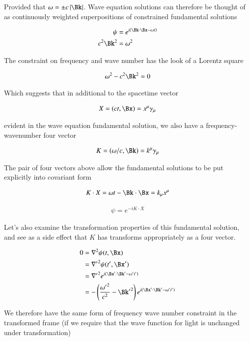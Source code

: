 Provided that $\omega = \pm c \Abs{\Bk}$.  Wave equation solutions can therefore be thought of as continuously weighted superpositions of constrained fundamental solutions

\begin{align}
\psi &= e^{i(\Bk \cdot \Bx - \omega t)} \\
c^2 \Bk^2 &= \omega^2
\end{align}

The constraint on frequency and wave number has the look of a Lorentz square

\begin{align}
\omega^2 - c^2 \Bk^2 = 0
\end{align}

Which suggests that in additional to the spacetime vector

\begin{align}
X = (ct, \Bx) = x^\mu \gamma_\mu
\end{align}

evident in the wave equation fundamental solution, we also have a frequency-wavenumber four vector

\begin{align}
K = (\omega/c, \Bk) = k^\mu \gamma_\mu
\end{align}

The pair of four vectors above allow the fundamental solutions to be put explicitly into covariant form

\begin{align}
K \cdot X = \omega t - \Bk \cdot \Bx = k_\mu x^\mu
\end{align}

\begin{align}
\psi = e^{-i K \cdot X}
\end{align}

Let's also examine the transformation properties of this fundamental solution, and see as a side effect that $K$
has transforms appropriately as a four vector.

\begin{align*}
0 &= \grad^2 \psi(t,\Bx) \\
&= {\grad'}^2 \psi(t',\Bx') \\
&= {\grad'}^2 e^{i(\Bx' \cdot \Bk' - \omega' t')} \\
&= -\left(\frac{{\omega'}^2}{c^2} - {\Bk'}^2 \right) e^{i(\Bx' \cdot \Bk' - \omega' t')} \\
\end{align*}

We therefore have the same form of frequency wave number constraint in the transformed frame (if we require that
the wave function for light is unchanged under transformation)

